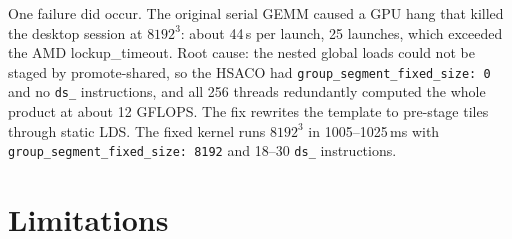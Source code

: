 \documentclass[10pt,twoside]{article}
\begin{document}
One failure did occur. The original serial GEMM caused a GPU hang that killed the desktop
session at $8192^3$: about 44\,s per launch, 25 launches, which exceeded the AMD
lockup\_timeout. Root cause: the nested global loads could not be staged by promote-shared, so
the HSACO had \texttt{group\_segment\_fixed\_size: 0} and no \texttt{ds\_} instructions, and
all 256 threads redundantly computed the whole product at about 12 GFLOPS. The fix rewrites
the template to pre-stage tiles through static LDS. The fixed kernel runs $8192^3$ in
1005--1025\,ms with \texttt{group\_segment\_fixed\_size: 8192} and 18--30 \texttt{ds\_}
instructions.

\section{Limitations}
\label{sec:limitations}
\end{document}
